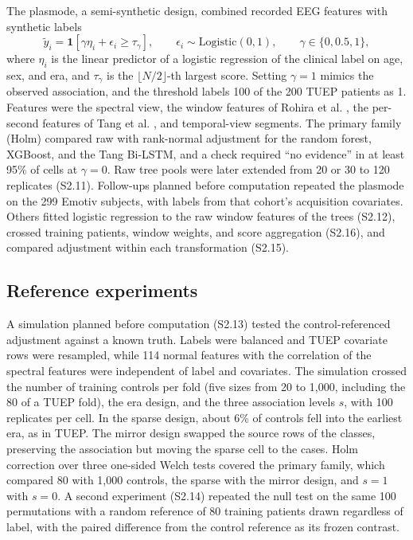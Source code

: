 \documentclass[final,1p,times]{elsarticle}
\begin{document}
The plasmode, a semi-synthetic design, combined recorded EEG features with synthetic labels
\begin{equation}\label{eq:plasmode}
\tilde{y}_i=\mathbf{1}\left[\gamma\eta_i+\epsilon_i\geq\tau_{\gamma}\right],\qquad \epsilon_i\sim\mathrm{Logistic}(0,1),\qquad \gamma\in\{0,0.5,1\},
\end{equation}
where $\eta_i$ is the linear predictor of a logistic regression of the clinical label on age, sex, and era, and $\tau_{\gamma}$ is the $\lfloor N/2\rfloor$-th largest score. Setting $\gamma=1$ mimics the observed association, and the threshold labels 100 of the 200 TUEP patients as 1. Features were the spectral view, the window features of Rohira et al. \cite{rohira2023}, the per-second features of Tang et al. \cite{tang2024}, and temporal-view segments. The primary family (Holm) compared raw with rank-normal adjustment for the random forest, XGBoost, and the Tang Bi-LSTM, and a check required ``no evidence'' in at least 95\% of cells at $\gamma=0$. Raw tree pools were later extended from 20 or 30 to 120 replicates (S2.11). Follow-ups planned before computation repeated the plasmode on the 299 Emotiv subjects, with labels from that cohort's acquisition covariates. Others fitted logistic regression to the raw window features of the trees (S2.12), crossed training patients, window weights, and score aggregation (S2.16), and compared adjustment within each transformation (S2.15).

\subsection{Reference experiments}\label{sec:metode_referensi}

A simulation planned before computation (S2.13) tested the control-referenced adjustment against a known truth. Labels were balanced and TUEP covariate rows were resampled, while 114 normal features with the correlation of the spectral features were independent of label and covariates. The simulation crossed the number of training controls per fold (five sizes from 20 to 1,000, including the 80 of a TUEP fold), the era design, and the three association levels $s$, with 100 replicates per cell. In the sparse design, about 6\% of controls fell into the earliest era, as in TUEP. The mirror design swapped the source rows of the classes, preserving the association but moving the sparse cell to the cases. Holm correction over three one-sided Welch tests covered the primary family, which compared 80 with 1,000 controls, the sparse with the mirror design, and $s=1$ with $s=0$. A second experiment (S2.14) repeated the null test on the same 100 permutations with a random reference of 80 training patients drawn regardless of label, with the paired difference from the control reference as its frozen contrast.
\end{document}
